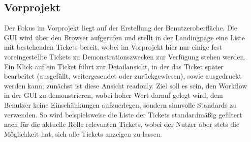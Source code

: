 \subsection{Vorprojekt}

    Der Fokus im Vorprojekt liegt auf der Erstellung der Benutzeroberfläche. Die GUI wird über den Browser aufgerufen und 
    stellt in der Landingpage eine Liste mit bestehenden Tickets bereit, wobei im Vorprojekt hier nur einige
    fest voreingestellte Tickets zu Demonstrationszwecken zur Verfügung stehen werden. Ein Klick auf ein Ticket führt zur
    Detailansicht, in der das Ticket später bearbeitet (ausgefüllt, weitergesendet oder zurückgewiesen), sowie ausgedruckt werden
    kann; zunächst ist diese Ansicht readonly. Ziel soll es sein, den Workflow in der GUI zu demonstrieren, wobei hoher Wert darauf
    gelegt wird, dem Benutzer keine Einschänkungen aufzuerlegen, sondern sinnvolle Standards zu verwenden. So wird beispielsweise
    die Liste der Tickets standardmäßig gefiltert nach für die aktuelle Rolle relevanten Tickets, wobei der Nutzer aber stets die Möglichkeit
    hat, sich alle Tickets anzeigen zu lassen.
